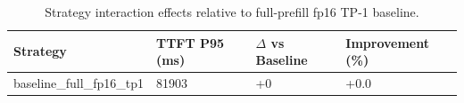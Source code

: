 \begin{table}
\caption{Strategy interaction effects relative to full-prefill fp16 TP-1 baseline.}
\label{tab:interactions}
\begin{tabular}{llll}
\toprule
Strategy & TTFT P95 (ms) & $\Delta$ vs Baseline & Improvement (\%) \\
\midrule
baseline\_full\_fp16\_tp1 & 81903 & +0 & +0.0 \\
\bottomrule
\end{tabular}
\end{table}
